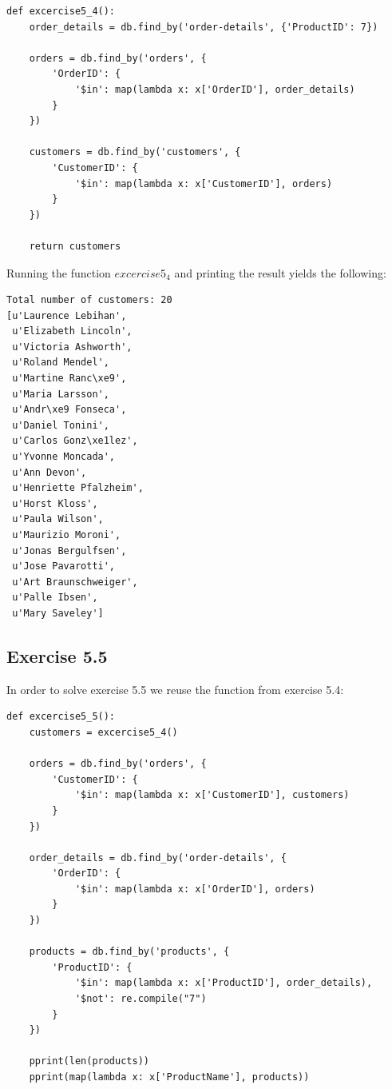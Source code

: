 \documentclass{article}
\begin{document}
\begin{lstlisting}
def excercise5_4():
    order_details = db.find_by('order-details', {'ProductID': 7})

    orders = db.find_by('orders', {
        'OrderID': {
            '$in': map(lambda x: x['OrderID'], order_details)
        }
    })

    customers = db.find_by('customers', {
        'CustomerID': {
            '$in': map(lambda x: x['CustomerID'], orders)
        }
    })

    return customers
\end{lstlisting}

Running the function $excercise5_4$ and printing the result yields the following:

\begin{lstlisting}
Total number of customers: 20
[u'Laurence Lebihan',
 u'Elizabeth Lincoln',
 u'Victoria Ashworth',
 u'Roland Mendel',
 u'Martine Ranc\xe9',
 u'Maria Larsson',
 u'Andr\xe9 Fonseca',
 u'Daniel Tonini',
 u'Carlos Gonz\xe1lez',
 u'Yvonne Moncada',
 u'Ann Devon',
 u'Henriette Pfalzheim',
 u'Horst Kloss',
 u'Paula Wilson',
 u'Maurizio Moroni',
 u'Jonas Bergulfsen',
 u'Jose Pavarotti',
 u'Art Braunschweiger',
 u'Palle Ibsen',
 u'Mary Saveley']
\end{lstlisting}

\newpage

\subsection{Exercise 5.5}
\label{sub:Exercise 5.5}

In order to solve exercise 5.5 we reuse the function from exercise 5.4:

\begin{lstlisting}
def excercise5_5():
    customers = excercise5_4()

    orders = db.find_by('orders', {
        'CustomerID': {
            '$in': map(lambda x: x['CustomerID'], customers)
        }
    })

    order_details = db.find_by('order-details', {
        'OrderID': {
            '$in': map(lambda x: x['OrderID'], orders)
        }
    })

    products = db.find_by('products', {
        'ProductID': {
            '$in': map(lambda x: x['ProductID'], order_details),
            '$not': re.compile("7")
        }
    })

    pprint(len(products))
    pprint(map(lambda x: x['ProductName'], products))
\end{lstlisting}
\end{document}

